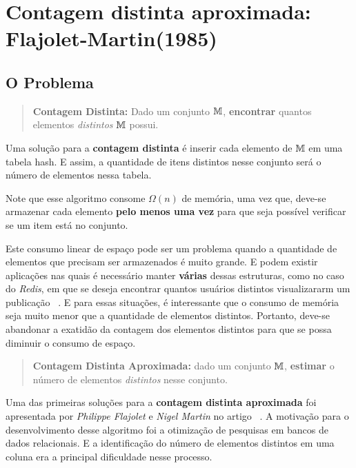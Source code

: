 \newcommand{\bitmap}{\text{BITMAP}}

\chapter{Contagem distinta aproximada: Flajolet-Martin(1985)}
\label{lab:flajolet-martin}

\section{O Problema}

\begin{quote}
  \textbf{Contagem Distinta:} Dado um conjunto $\mathbb{M}$, \textbf{encontrar} quantos elementos \textit{distintos}
  $\mathbb{M}$ possui.
\end{quote}

Uma solução para a \textbf{contagem distinta} é inserir cada elemento de $\mathbb{M}$ em uma tabela hash. 
E assim, a quantidade de itens distintos nesse conjunto será o número de elementos nessa tabela.

Note que esse algoritmo consome $\Omega(n)$ de memória, uma vez que, deve-se armazenar cada elemento 
\textbf{pelo menos uma vez} para que seja possível verificar se um item está no conjunto.

Este consumo linear de espaço pode ser um problema quando a quantidade de elementos que precisam ser armazenados é muito 
grande. E podem existir aplicações nas quais é necessário manter \textbf{várias} dessas estruturas, como no caso do 
\textit{Redis}, em que se deseja encontrar quantos usuários distintos visualizararm um publicação ~\citep{Redis}. E para 
essas situações, é interessante que o consumo de memória seja muito menor que a quantidade de elementos distintos. 
Portanto, deve-se abandonar a exatidão da contagem dos elementos distintos para que se possa diminuir o consumo de 
espaço.

\begin{quote}
  \textbf{Contagem Distinta Aproximada:} dado um conjunto $\mathbb{M}$, \textbf{estimar} o número de elementos 
  \textit{distintos} nesse conjunto.
\end{quote}

Uma das primeiras soluções para a \textbf{contagem distinta aproximada} foi apresentada por \textit{Philippe Flajolet} e 
\textit{Nigel Martin} no artigo ~\citep{flajolet:martin:85}.
A motivação para o desenvolvimento desse algoritmo foi a otimização de pesquisas em bancos de dados relacionais.
E a identificação do número de elementos distintos em uma coluna era a principal dificuldade nesse processo.

